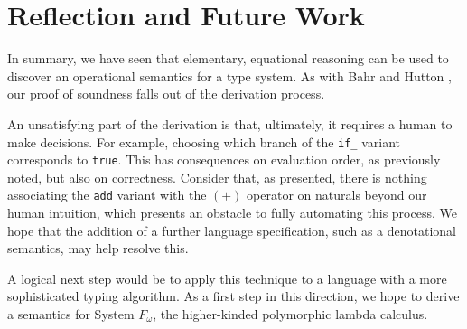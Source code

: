 \documentclass[manuscript,screen,sigplan]{acmart}
\begin{document}
\section{Reflection and Future Work}

In summary, we have seen that elementary, equational reasoning can be used to
discover an operational semantics for a type system. As with Bahr and Hutton
\cite{bahr:2015}, our proof of soundness falls out of the derivation process.

An unsatisfying part of the derivation is that, ultimately, it requires a human
to make decisions. For example, choosing which branch of the \texttt{if\_}
variant corresponds to \texttt{true}. This has consequences on evaluation
order, as previously noted, but also on correctness. Consider that, as
presented, there is nothing associating the \texttt{add} variant with the $(+)$
operator on naturals beyond our human intuition, which presents an obstacle to
fully automating this process. We hope that the addition of a further language
specification, such as a denotational semantics, may help resolve this.

A logical next step would be to apply this technique to a language with a more
sophisticated typing algorithm. As a first step in this direction, we hope to
derive a semantics for System $F_{\omega}$, the higher-kinded polymorphic
lambda calculus.



\end{document}
